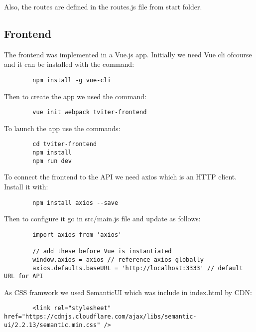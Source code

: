 	Also, the routes are defined in the routes.js file from start folder.
	
\subsection{Frontend}
	The frontend was implemented in a Vue.js app. Initially we need Vue cli ofcourse and it can be installed with the command:
	\begin{verbatim}
		npm install -g vue-cli
	\end{verbatim}
	
	Then to create the app we used the command:
	\begin{verbatim}
		vue init webpack tviter-frontend
	\end{verbatim}
	
	To launch the app use the commands:
	\begin{verbatim}
		cd tviter-frontend
		npm install
		npm run dev
	\end{verbatim}
	
	To connect the frontend to the API we need axios which is an HTTP client. Install it with:
	\begin{verbatim}
		npm install axios --save
	\end{verbatim}
	
	Then to configure it go in src/main.js file and update as follows:
	\begin{verbatim}
		import axios from 'axios'
		
		// add these before Vue is instantiated
		window.axios = axios // reference axios globally
		axios.defaults.baseURL = 'http://localhost:3333' // default URL for API
	\end{verbatim}
	
	As CSS framwork we used SemanticUI which was include in index.html by CDN:
	\begin{verbatim}
		<link rel="stylesheet" href="https://cdnjs.cloudflare.com/ajax/libs/semantic-ui/2.2.13/semantic.min.css" />
	\end{verbatim}
	
